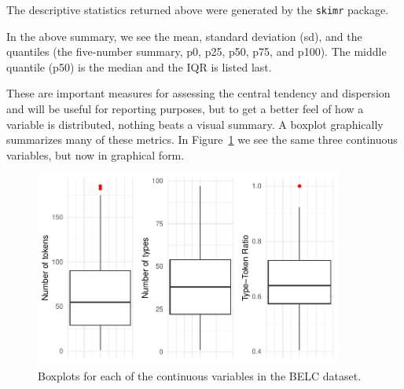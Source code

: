 \documentclass[
  letterpaper,
]{latex/krantz}
\begin{document}
\begin{tcolorbox}[enhanced jigsaw, opacitybacktitle=0.6, breakable, colframe=quarto-callout-warning-color-frame, arc=.35mm, left=2mm, leftrule=.75mm, title=\textcolor{quarto-callout-warning-color}{\faExclamationTriangle}\hspace{0.5em}{Tip}, opacityback=0, colback=white, toptitle=1mm, rightrule=.15mm, titlerule=0mm, bottomtitle=1mm, bottomrule=.15mm, coltitle=black, colbacktitle=quarto-callout-warning-color!10!white, toprule=.15mm]
The descriptive statistics returned above were generated by the
\texttt{skimr} package.
\end{tcolorbox}

In the above summary, we see the mean, standard deviation (sd), and the
quantiles (the five-number summary, p0, p25, p50, p75, and p100). The
middle quantile (p50) is the median and the IQR is listed last.

These are important measures for assessing the central tendency and
dispersion and will be useful for reporting purposes, but to get a
better feel of how a variable is distributed, nothing beats a visual
summary. A boxplot graphically summarizes many of these metrics. In
Figure~\ref{fig-summaries-boxplots-belc} we see the same three
continuous variables, but now in graphical form.

\begin{figure}

{\centering \includegraphics[width=0.9\textwidth,height=\textheight]{./approaching-analysis_files/figure-pdf/fig-summaries-boxplots-belc-1.pdf}

}

\caption{\label{fig-summaries-boxplots-belc}Boxplots for each of the
continuous variables in the BELC dataset.}

\end{figure}
\end{document}
